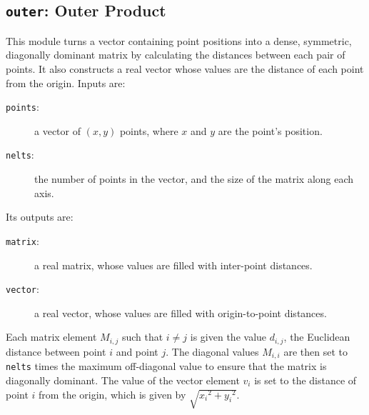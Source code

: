 \subsection{{\tt{outer}}:
	Outer Product
	\label{s:toys-outer}}

This module turns a vector containing point positions
into a dense, symmetric, diagonally dominant matrix
by calculating the distances between each pair of points.
It also constructs a real vector whose values are
the distance of each point from the origin.
Inputs are:
\begin{description}
\item[{\tt{points}}:]
	a vector of $(x,y)$ points, where $x$ and $y$ are the point's position.
\item[{\tt{nelts}}:]
	the number of points in the vector, and the size of the matrix along each axis.
\end{description}
Its outputs are:
\begin{description}
\item[{\tt{matrix}}:]
	a real matrix, whose values are filled with inter-point distances.
\item[{\tt{vector}}:]
	a real vector, whose values are filled with origin-to-point distances.
\end{description}
Each matrix element $M_{i,j}$ such that $i \neq j$
is given the value $d_{i, j}$,
the Euclidean distance between point $i$ and point $j$.
The diagonal values $M_{i, i}$ are then set to
{\tt{nelts}} times the maximum off-diagonal value
to ensure that the matrix is diagonally dominant.
The value of the vector element $v_i$ is set to
the distance of point $i$ from the origin,
which is given by $\sqrt{{x_i}^2 + {y_i}^2}$.
